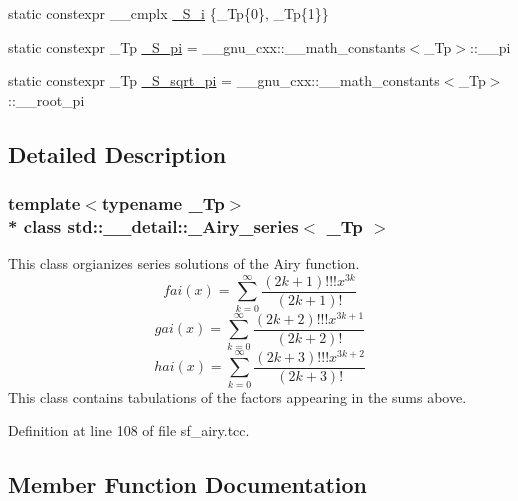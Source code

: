 \begin{DoxyCompactItemize}
\item 
static constexpr \+\_\+\+\_\+cmplx \hyperlink{classstd_1_1____detail_1_1__Airy__series_a4133b308af0c967a73c918af22c93b09}{\+\_\+\+S\+\_\+i} \{\+\_\+\+Tp\{0\}, \+\_\+\+Tp\{1\}\}
\item 
static constexpr \+\_\+\+Tp \hyperlink{classstd_1_1____detail_1_1__Airy__series_a9de354dae47d41acc60824681d864184}{\+\_\+\+S\+\_\+pi} = \+\_\+\+\_\+gnu\+\_\+cxx\+::\+\_\+\+\_\+math\+\_\+constants$<$\+\_\+\+Tp$>$\+::\+\_\+\+\_\+pi
\item 
static constexpr \+\_\+\+Tp \hyperlink{classstd_1_1____detail_1_1__Airy__series_a3fd1fba37ef8beb0d89854d4e58b8a38}{\+\_\+\+S\+\_\+sqrt\+\_\+pi} = \+\_\+\+\_\+gnu\+\_\+cxx\+::\+\_\+\+\_\+math\+\_\+constants$<$\+\_\+\+Tp$>$\+::\+\_\+\+\_\+root\+\_\+pi
\end{DoxyCompactItemize}


\subsection{Detailed Description}
\subsubsection*{template$<$typename \+\_\+\+Tp$>$\\*
class std\+::\+\_\+\+\_\+detail\+::\+\_\+\+Airy\+\_\+series$<$ \+\_\+\+Tp $>$}

This class orgianizes series solutions of the Airy function. \[ fai(x) = \sum_{k=0}^\infty \frac{(2k+1)!!!x^{3k}}{(2k+1)!} \] \[ gai(x) = \sum_{k=0}^\infty \frac{(2k+2)!!!x^{3k+1}}{(2k+2)!} \] \[ hai(x) = \sum_{k=0}^\infty \frac{(2k+3)!!!x^{3k+2}}{(2k+3)!} \] This class contains tabulations of the factors appearing in the sums above. 

Definition at line 108 of file sf\+\_\+airy.\+tcc.



\subsection{Member Function Documentation}
